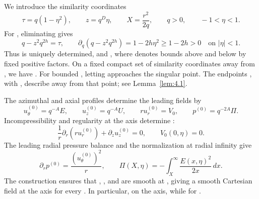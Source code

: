 We introduce the similarity coordinates
\begin{equation}
 \tau=q(1-\eta^2),\qquad z=q^D\eta,\qquad X=\frac{r^2}{2q},
 \qquad q>0,\qquad -1<\eta<1.
 \tag{3.2}\label{eq:3.2}
\end{equation}
For , eliminating  gives
\[
 q-z^2q^{2h}=\tau,\qquad
 \partial_q(q-z^2q^{2h})=1-2h\eta^2\geq 1-2h>0
 \quad\text{on }|\eta|<1.
\]
Thus  is uniquely determined, and
, where  denotes bounds above
and below by fixed positive factors. On a fixed compact set of similarity coordinates away
from , we have .
For bounded , letting  approaches the
singular point. The endpoints , with
, describe  away from that point; see
Lemma~\ref{lem:4.1}.

The azimuthal and axial profiles  determine the leading
fields by
\[
 u_\theta^{(0)}=q^{-A}E,\qquad u_z^{(0)}=q^{-A}U,
 \qquad
 ru_r^{(0)}=V_0,\qquad p^{(0)}=q^{-2A}\Pi.
\]
Incompressibility and regularity at the axis determine :
\[
 \frac1r\partial_r(ru_r^{(0)})+\partial_z u_z^{(0)}=0,
 \qquad V_0(0,\eta)=0.
\]
%
The leading radial pressure balance and the normalization at radial infinity give
\[
 \partial_r p^{(0)}=\frac{(u_\theta^{(0)})^2}{r},
 \qquad
 \Pi(X,\eta)=-\int_X^\infty\frac{E(x,\eta)^2}{2x}\,dx.
\]
The construction ensures that ,
, and  are smooth at
, giving a smooth Cartesian field at the axis for every
. In particular,  on the axis,
while  for .

